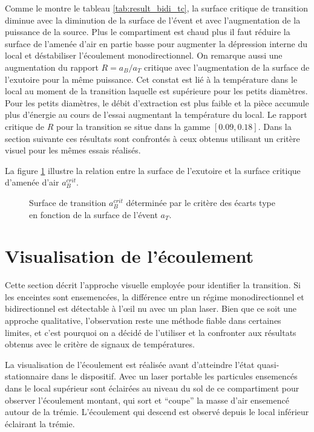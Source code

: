 Comme le montre le tableau \ref{tab:result_bidi_tc}, la surface critique de transition diminue avec la diminution de la surface de l'évent et avec l'augmentation de la puissance de la source. Plus le compartiment est chaud plus il faut réduire la surface de l'amenée d'air en partie basse pour augmenter la dépression interne du local et déstabiliser l'écoulement monodirectionnel. On remarque aussi une augmentation du rapport $R=a_B/a_T$ critique avec l'augmentation de la surface de l'exutoire pour la même puissance. Cet constat est lié à la température dans le local au moment de la transition laquelle est supérieure pour les petits diamètres. Pour les petits diamètres, le débit d'extraction est plus faible et la pièce accumule plus d'énergie au cours de l'essai augmentant la température du local. Le rapport critique de $R$ pour la transition se situe dans la gamme ${[0.09,0.18]}$. Dans la section suivante ces résultats sont confrontés à ceux obtenus utilisant un critère visuel pour les mêmes essais réalisés.

La figure \ref{fig:ab_bidi_TC} illustre la relation entre la surface de l'exutoire et la surface critique d'amenée d'air $a_B^{crit}$.

\begin{figure}
\centering
\resizebox{0.7\textwidth}{!}{}
\caption{Surface de transition $a^{crit}_B$ déterminée par le critère des écarts type en fonction de la surface de l'évent $a_T$.}
\label{fig:ab_bidi_TC}
\end{figure}

\section{Visualisation de l'écoulement}
Cette section décrit l'approche visuelle employée pour identifier la transition. Si les enceintes sont ensemencées, la différence entre un régime monodirectionnel et bidirectionnel est détectable à l’œil nu avec un plan laser. Bien que ce soit une approche qualitative, l'observation reste une méthode fiable dans certaines limites, et c'est pourquoi on a décidé de l'utiliser et la confronter aux résultats obtenus avec le critère de signaux de températures.

La visualisation de l'écoulement est réalisée avant d'atteindre l'état quasi-stationnaire dans le dispositif. Avec un laser portable les particules ensemencés dans le local supérieur sont éclairées au niveau du sol de ce compartiment pour observer l'écoulement montant, qui sort et ``coupe'' la masse d'air ensemencé autour de la trémie. L'écoulement qui descend est observé depuis le local inférieur éclairant la trémie.

